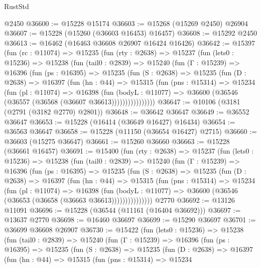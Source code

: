 \begin{lexlean}{RustStd}
\begin{coremodule}
    @2450
@36600 := @15228 @15174
@36603 := @15268 (@15269 @2450) @26904
@36607 := @15228 (@15260 (@36603 @16453) @16457)
@36608 := @15292 @2450
@36613 := @16462 (@16463 @36608 @26907 @16424 @16426)
@36642 := @15397
    (fun (rc : @11074) =>
    @15235
      (fun (rty : @2638) =>
      @15237
        (fun (lets0 : @15236) =>
        @15238
          (fun (tail0 : @2839) =>
          @15240
            (fun (Γ : @15239) =>
            @16396
              (fun (ps : @16395) =>
              @15235
                (fun (S : @2638) =>
                @15235
                  (fun (D : @2638) =>
                  @16397
                    (fun (hn : @44) =>
                    @15315
                      (fun (pns : @15314) =>
                      @15234
                        (fun (pl : @11074) =>
                        @16398
                          (fun (bodyL : @11077) =>
                          @36600 (@36546 (@36557 (@36568 (@36607 @36613))))))))))))))))
@36647 := @10106 (@3181 (@2791 (@3182 @2770) @2801))
@36648 := @36642 @36647
@36649 := @36552 @36647
@36653 := @15228 (@16414 (@36649 @16427) @16434)
@36654 := @36563 @36647
@36658 := @15228 (@11150 (@36654 @16427) @2715)
@36660 := @36603 (@15275 @36647)
@36661 := @15260 @36660
@36663 := @15228 (@36661 @16457)
@36691 := @15400
    (fun (rty : @2638) =>
    @15237
      (fun (lets0 : @15236) =>
      @15238
        (fun (tail0 : @2839) =>
        @15240
          (fun (Γ : @15239) =>
          @16396
            (fun (ps : @16395) =>
            @15235
              (fun (S : @2638) =>
              @15235
                (fun (D : @2638) =>
                @16397
                  (fun (hn : @44) =>
                  @15315
                    (fun (pns : @15314) =>
                    @15234
                      (fun (pl : @11074) =>
                      @16398
                        (fun (bodyL : @11077) =>
                        @36600 (@36546 (@36653 (@36658 (@36663 @36613)))))))))))))))
    @2770
@36692 := @13126 @11091
@36696 := @15228 (@36544 (@11161 (@16404 @36692)))
@36697 := @13637 @2770
@36698 := @16460 @36697
@36699 := @15290 @36697
@36701 := @36699 @36608 @26907
@36730 := @15422
    (fun (lets0 : @15236) =>
    @15238
      (fun (tail0 : @2839) =>
      @15240
        (fun (Γ : @15239) =>
        @16396
          (fun (ps : @16395) =>
          @15235
            (fun (S : @2638) =>
            @15235
              (fun (D : @2638) =>
              @16397
                (fun (hn : @44) =>
                @15315
                  (fun (pns : @15314) =>
                  @15234

\end{coremodule}
\end{lexlean}
